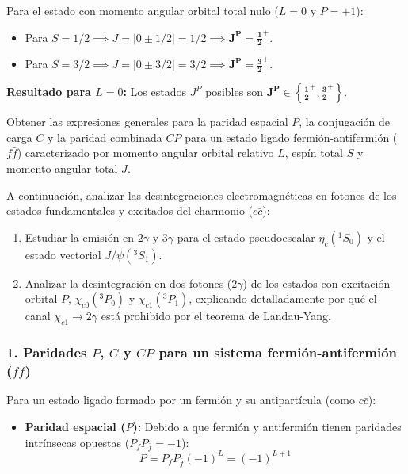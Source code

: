 \begin{problema}
Para el estado con momento angular orbital total nulo ($L = 0$ y $P = +1$):
\begin{itemize}
    \item Para $S = 1/2 \implies J = |0 \pm 1/2| = 1/2 \implies \mathbf{J^P = \frac{1}{2}^+}$.
    \item Para $S = 3/2 \implies J = |0 \pm 3/2| = 3/2 \implies \mathbf{J^P = \frac{3}{2}^+}$.
\end{itemize}

\textbf{Resultado para $L = 0$:} Los estados $J^P$ posibles son $\mathbf{J^P \in \left\{ \frac{1}{2}^+, \frac{3}{2}^+ \right\}}$.
\end{problema}
\newpage
\begin{problema}
Obtener las expresiones generales para la paridad espacial $P$, la conjugación de carga $C$ y la paridad combinada $CP$ para un estado ligado fermión-antifermión ($f\bar{f}$) caracterizado por momento angular orbital relativo $L$, espín total $S$ y momento angular total $J$.

A continuación, analizar las desintegraciones electromagnéticas en fotones de los estados fundamentales y excitados del charmonio ($c\bar{c}$):
\begin{enumerate}[label=\alph*)]
    \item Estudiar la emisión en $2\gamma$ y $3\gamma$ para el estado pseudoescalar $\eta_c(^1S_0)$ y el estado vectorial $J/\psi(^3S_1)$.
    \item Analizar la desintegración en dos fotones ($2\gamma$) de los estados con excitación orbital $P$, $\chi_{c0}(^3P_0)$ y $\chi_{c1}(^3P_1)$, explicando detalladamente por qué el canal $\chi_{c1} \rightarrow 2\gamma$ está prohibido por el teorema de Landau-Yang.
\end{enumerate}

\tcblower

\subsubsection*{1. Paridades $P$, $C$ y $CP$ para un sistema fermión-antifermión ($f\bar{f}$)}

Para un estado ligado formado por un fermión y su antipartícula (como $c\bar{c}$):
\begin{itemize}
    \item \textbf{Paridad espacial ($P$):} Debido a que fermión y antifermión tienen paridades intrínsecas opuestas ($P_f P_{\bar{f}} = -1$):
    \begin{equation*}
    P = P_f P_{\bar{f}} (-1)^L = (-1)^{L+1}
    \end{equation*}


\end{itemize}
\end{problema}
